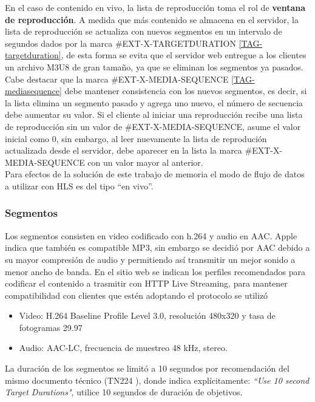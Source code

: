 En el caso de contenido en vivo, la lista de reproducción toma el rol de \textbf{ventana de reproducción}. A medida que más contenido se almacena en el servidor, la lista de reproducción se actualiza con nuevos segmentos en un intervalo de segundos dados por la marca \#EXT-X-TARGETDURATION \ref{TAG-targetduration}, de esta forma se evita que el servidor web entregue a los clientes un archivo M3U8 de gran tamaño, ya que se eliminan los segmentos ya pasados.\\

Cabe destacar que la marca \#EXT-X-MEDIA-SEQUENCE \ref{TAG-mediasequence} debe mantener consistencia con los nuevos segmentos, es decir, si la lista elimina un segmento pasado y agrega uno nuevo, el número de secuencia debe aumentar su valor. Si el cliente al iniciar una reproducción recibe una lista de reproducción sin un valor de \#EXT-X-MEDIA-SEQUENCE, asume el valor inicial como 0, sin embargo, al leer nuevamente la lista de reprodución actualizada desde el servidor, debe aparecer en la lista la marca \#EXT-X-MEDIA-SEQUENCE con un valor mayor al anterior.\\

Para efectos de la solución de este trabajo de memoria el modo de flujo de datos a utilizar con HLS es del tipo ``en vivo''.
\subsubsection{Segmentos}
Los segmentos consisten en video codificado con h.264 y audio en AAC. Apple indica que también es compatible MP3, sin embargo se decidió por AAC debido a su mayor compresión de audio y permitiendo así transmitir un mejor sonido a menor ancho de banda. En el sitio web \cite{apple-hlsencoding} se indican los perfiles recomendados para codificar el contenido a trasmitir con HTTP Live Streaming, para mantener compatibilidad con clientes que estén adoptando el protocolo se utilizó  
\begin{itemize}
\item Video: H.264 Baseline Profile Level 3.0, resolución 480x320 y tasa de fotogramas 29.97

\item Audio: AAC-LC, frecuencia de muestreo 48 kHz, stereo.

\end{itemize}

La duración de los segmentos se limitó a 10 segundos por recomendación del mismo documento técnico (TN224 \cite{apple-hlsencoding}), donde indica explícitamente: \textit{\textquotedblleft Use 10 second Target Durations"}, utilice 10 segundos de duración de objetivos.

